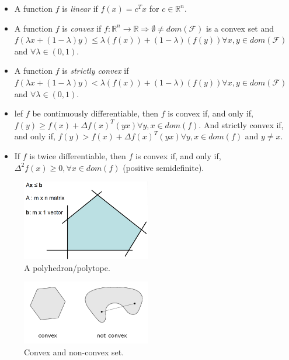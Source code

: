 \documentclass[main]{subfiles}
\begin{document}
\begin{itemize}
\item A function $f$ is \emph{linear} if $f(x) = c^{T}x$ for $c \in
\mathbb{R}^{n}$.

\item A function $f$ is \emph{convex} if $f: \mathbb{R}^{n} \rightarrow
\mathbb{R} \Rightarrow \emptyset \neq dom(\mathcal{F})$ is a convex set and
$f(\lambda x + (1-\lambda)y) \leq \lambda (f(x)) + (1-\lambda)(f(y)) \forall
x, y \in dom(\mathcal{F})$ and $\forall \lambda \in (0,1)$.

\item A function $f$ is \emph{strictly convex} if $f(\lambda x + (1-\lambda)y)
< \lambda (f(x)) + (1-\lambda)(f(y)) \forall x, y \in dom(\mathcal{F})$ and
$\forall \lambda \in (0,1)$.

\item lef $f$ be continuously differentiable, then $f$ is convex if, and only
if, $f(y) \geq f(x) + \Delta f(x)^{T}(yx) \forall y,x \in dom(f)$. And strictly
convex if, and only if, $f(y) > f(x) + \Delta f(x)^{T}(yx) \forall y,x \in
dom(f)$ and $y \neq x$.

\item If $f$ is twice differentiable, then $f$ is convex if, and only if,
$\Delta^{2} f(x) \geq 0, \forall x \in dom(f)$ (positive semidefinite).
\end{itemize}

\begin{figure}
  \label{fig:polyhedron}
  \caption{A polyhedron/polytope.}
  \centering
    \includegraphics[width=0.5\textwidth]{imgs/polyhedron.png}
\end{figure}

\begin{figure}
  \label{fig:convex-set}
  \caption{Convex and non-convex set.}
  \centering
    \includegraphics[width=0.5\textwidth]{imgs/convex-set.png}
\end{figure}
\end{document}
